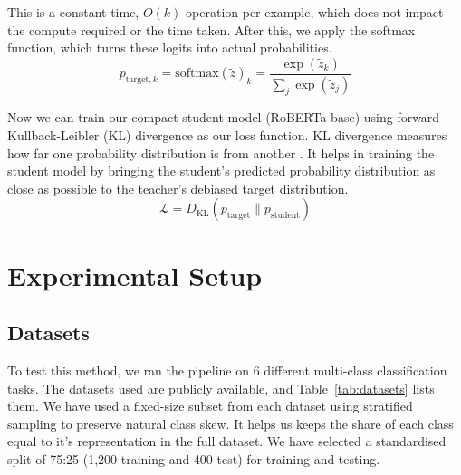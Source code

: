 \documentclass[11pt]{article}
\begin{document}
This is a constant-time, $O(k)$ operation per example, which does not impact the compute required or the time taken.
After this, we apply the softmax function, which turns these logits into actual probabilities.
\begin{equation}
p_{\text{target},k} = \text{softmax}(\tilde{z})_k = \frac{\exp(\tilde{z}_k)}{\sum_{j} \exp(\tilde{z}_j)}
\end{equation}

Now we can train our compact student model (RoBERTa-base) using forward Kullback-Leibler (KL) divergence as our loss function.
KL divergence measures how far one probability distribution is from another \citep{kullback1951information}.
It helps in training the student model by bringing the student's predicted probability distribution as close as possible to the teacher's debiased target distribution.
\begin{equation}
\mathcal{L} = D_{\text{KL}}(p_{\text{target}} \parallel p_{\text{student}})
\end{equation}

\section{Experimental Setup}

\subsection{Datasets}

To test this method, we ran the pipeline on 6 different multi-class classification tasks.
The datasets used are publicly available, and Table~\ref{tab:datasets} lists them.
We have used a fixed-size subset from each dataset using stratified sampling to preserve natural class skew. It helps us keeps the share of each class equal to it's representation in the full dataset.
We have selected a standardised split of 75:25 (1,200 training and 400 test) for training and testing.

\begin{table}[t]
\centering
\small
{}
\caption{Datasets and their number of classes $K$. Each dataset has 1,200 training and 400 test examples. Table~\ref{tab:prompts} lists the classes.}
\label{tab:datasets}
\end{table}
\end{document}

